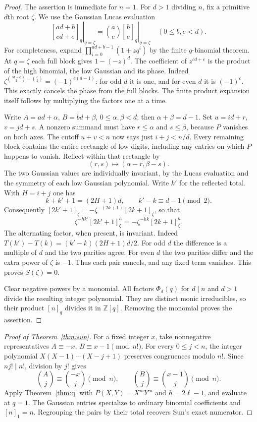 \documentclass[11pt,a4paper]{article}
\theoremstyle{definition}\newtheorem{problem}[theorem]{Auxiliary problem}
\theoremstyle{remark}\newtheorem*{remark}{Remark}
\newcommand{\qbin}[2]{\genfrac{[}{]}{0pt}{}{#1}{#2}_{\!q}}
\begin{document}
\begin{proof}
The assertion is immediate for $n=1$. For $d>1$ dividing $n$, fix a primitive $d$th root $\zeta$. We use the Gaussian Lucas evaluation
\[
 \left.\qbin{ad+b}{cd+e}\right|_{q=\zeta}
 =\binom ac\left.\qbin be\right|_{q=\zeta}
 \quad(0\le b,e<d).
\]
For completeness, expand $\prod_{i=0}^{ad+b-1}(1+zq^i)$ by the finite $q$-binomial theorem. At $q=\zeta$ each full block gives $1-(-z)^d$. The coefficient of $z^{cd+e}$ is the product of the high binomial, the low Gaussian and its phase. Indeed
$\zeta^{\binom{cd+e}{2}-\binom e2}=(-1)^{c(d-1)}$:
for odd $d$ it is one, and for even $d$ it is $(-1)^c$. This exactly cancels the phase from the full blocks. The finite product expansion itself follows by multiplying the factors one at a time.

Write $A=ad+\alpha$, $B=bd+\beta$, $0\le\alpha,\beta<d$; then $\alpha+\beta=d-1$. Set $u=id+r$, $v=jd+s$. A nonzero summand must have $r\le\alpha$ and $s\le\beta$, because $P$ vanishes on both axes. The cutoff $u+v<n$ now says just $i+j<n/d$. Every remaining block contains the entire rectangle of low digits, including any entries on which $P$ happens to vanish. Reflect within that rectangle by
\[
    (r,s)\longmapsto(\alpha-r,\beta-s).
\]
The two Gaussian values are individually invariant, by the Lucas evaluation and the symmetry of each low Gaussian polynomial. Write $k'$ for the reflected total. With $H=i+j$ one has
\[
 k+k'+1=(2H+1)d,\qquad k'-k\equiv d-1\pmod 2.
\]
Consequently $[2k'+1]_\zeta=-\zeta^{-(2k+1)}[2k+1]_\zeta$, so that
\[
 \zeta^{-hk'}[2k'+1]_\zeta^h=-\zeta^{-hk}[2k+1]_\zeta^h.
\]
The alternating factor, when present, is invariant. Indeed $T(k')-T(k)=(k'-k)(2H+1)d/2$. For odd $d$ the difference is a multiple of $d$ and the two parities agree. For even $d$ the two parities differ and the extra power of $\zeta$ is $-1$. Thus each pair cancels, and any fixed term vanishes. This proves $S(\zeta)=0$.

Clear negative powers by a monomial. All factors $\Phi_d(q)$ for $d\mid n$ and $d>1$ divide the resulting integer polynomial. They are distinct monic irreducibles, so their product $[n]_q$ divides it in $\mathbb Z[q]$. Removing the monomial proves the assertion.
\end{proof}

\begin{proof}[Proof of Theorem~\ref{thm:sun}]
For a fixed integer $x$, take nonnegative representatives $A\equiv-x$, $B\equiv x-1\pmod{n!}$. For every $0\le j<n$, the integer polynomial $X(X-1)\cdots(X-j+1)$ preserves congruences modulo $n!$. Since $nj!\mid n!$, division by $j!$ gives
\[
 \binom Aj\equiv\binom{-x}j\pmod n,\qquad
 \binom Bj\equiv\binom{x-1}j\pmod n .
\]
Apply Theorem~\ref{thm:q} with $P(X,Y)=X^mY^m$ and $h=2\ell-1$, and evaluate at $q=1$. The Gaussian entries specialize to ordinary binomial coefficients and $[n]_1=n$. Regrouping the pairs by their total recovers Sun's exact numerator.
\end{proof}
\end{document}
